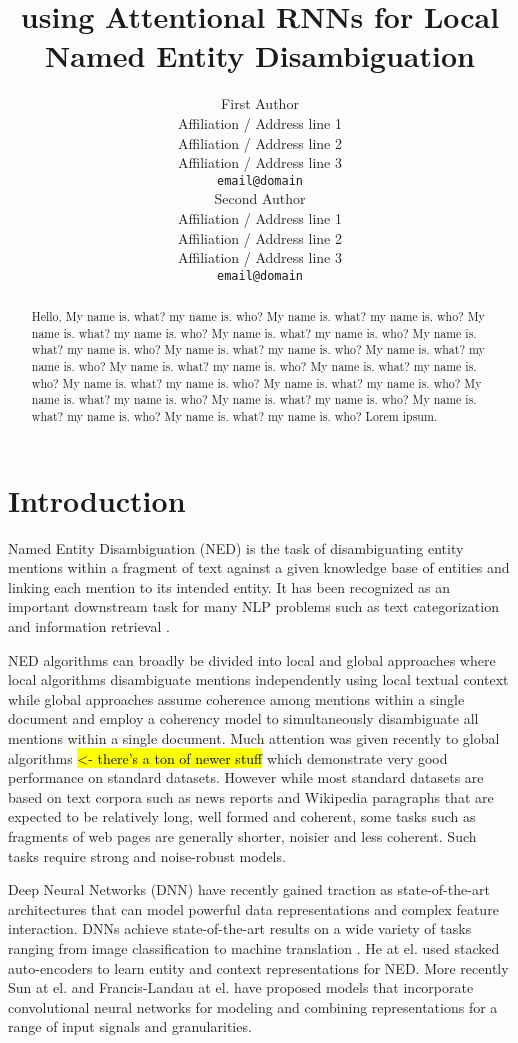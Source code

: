 \documentclass[11pt]{article}
\title{using Attentional RNNs for Local Named Entity Disambiguation}
\author{First Author \\
	Affiliation / Address line 1 \\
	Affiliation / Address line 2 \\
	Affiliation / Address line 3 \\
	{\tt email@domain} \\\And
	Second Author \\
	Affiliation / Address line 1 \\
	Affiliation / Address line 2 \\
	Affiliation / Address line 3 \\
	{\tt email@domain} \\}
\date{}
\begin{document}
	\maketitle
	\begin{abstract}
		Hello, My name is. what? my name is. who?
		My name is. what? my name is. who?
		My name is. what? my name is. who?
		My name is. what? my name is. who?
		My name is. what? my name is. who?
		My name is. what? my name is. who?
		My name is. what? my name is. who?
		My name is. what? my name is. who?
		My name is. what? my name is. who?
		My name is. what? my name is. who?
		My name is. what? my name is. who?
		My name is. what? my name is. who?
		My name is. what? my name is. who?
		My name is. what? my name is. who?
		My name is. what? my name is. who? Lorem ipsum.
	\end{abstract}
	
	\section{Introduction}
	
	Named Entity Disambiguation (NED) is the task of disambiguating entity mentions within a fragment of text against a given knowledge base of entities and linking each mention to its intended entity. It has been recognized as an important downstream task for many NLP problems such as text categorization \cite{gabrilovich2007computing} and information retrieval \cite{dalton2014entity}. 
	
	NED algorithms can broadly be divided into local and global approaches where local algorithms disambiguate mentions independently using local textual context while global approaches assume coherence among mentions within a single document and employ a coherency model to simultaneously disambiguate all mentions within a single document. Much attention was given recently to global algorithms \cite{ratinov2011local,guo2014entity,pershina2015personalized} \hl{<- there's a ton of newer stuff} which demonstrate very good performance on standard datasets. However while most standard datasets are based on text corpora such as news reports and Wikipedia paragraphs that are expected to be relatively long, well formed and coherent, some tasks such as fragments of web pages are generally shorter, noisier and less coherent. Such tasks require strong and noise-robust models.
	
	Deep Neural Networks (DNN) have recently gained traction as state-of-the-art architectures that can model powerful data representations and complex feature interaction. DNNs achieve state-of-the-art results on a wide variety of tasks ranging from image classification \cite{krizhevsky2012imagenet} to machine translation \cite{bahdanau2014neural}. He at el. \cite{he2013learning} used stacked auto-encoders to learn entity and context representations for NED. More recently Sun at el. and Francis-Landau at el. \cite{sun2015modeling, francis2016capturing} have proposed models that incorporate convolutional neural networks for modeling and combining representations for a range of input signals and granularities. 
	
\end{document}
